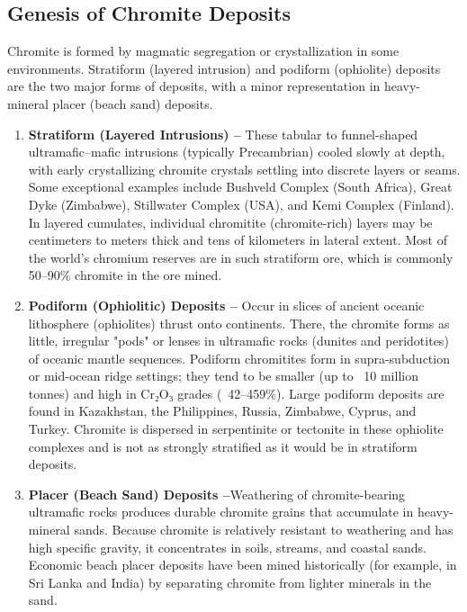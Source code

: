 \documentclass[12pt,a4paper, top=1.9cm, bottom=2.03cm, left=3.81cm, right=1.9cm]{article}
\begin{document}
\subsection{Genesis of Chromite Deposits}
\noindent\fontsize{12}{14}\selectfont Chromite is formed by magmatic segregation or crystallization in some environments. Stratiform (layered intrusion) and podiform (ophiolite) deposits are the two major forms of deposits, with a minor representation in heavy-mineral placer (beach sand) deposits.
\begin{enumerate}[label=\arabic*.]  %
    \item \textbf{Stratiform (Layered Intrusions) –} These tabular to funnel-shaped ultramafic–mafic intrusions (typically Precambrian) cooled slowly at depth, with early crystallizing chromite crystals settling into discrete layers or seams. Some exceptional examples include Bushveld Complex (South Africa), Great Dyke (Zimbabwe), Stillwater Complex (USA), and Kemi Complex (Finland). In layered cumulates, individual chromitite (chromite-rich) layers may be centimeters to meters thick and tens of kilometers in lateral extent. Most of the world's chromium reserves are in such stratiform ore, which is commonly 50–90\% chromite in the ore mined.
    \item \textbf{Podiform (Ophiolitic) Deposits –} Occur in slices of ancient oceanic lithosphere (ophiolites) thrust onto continents. There, the chromite forms as little, irregular "pods" or lenses in ultramafic rocks (dunites and peridotites) of oceanic mantle sequences. Podiform chromitites form in supra-subduction or mid-ocean ridge settings; they tend to be smaller (up to ~10 million tonnes) and high in Cr₂O₃ grades (~42–459\%). Large podiform deposits are found in Kazakhstan, the Philippines, Russia, Zimbabwe, Cyprus, and Turkey. Chromite is dispersed in serpentinite or tectonite in these ophiolite complexes and is not as strongly stratified as it would be in stratiform deposits.
    \item \textbf{Placer (Beach Sand) Deposits –}Weathering of chromite-bearing ultramafic rocks produces durable chromite grains that accumulate in heavy-mineral sands. Because chromite is relatively resistant to weathering and has high specific gravity, it concentrates in soils, streams, and coastal sands. Economic beach placer deposits have been mined historically (for example, in Sri Lanka and India) by separating chromite from lighter minerals in the sand.
\end{enumerate}
\end{document}
